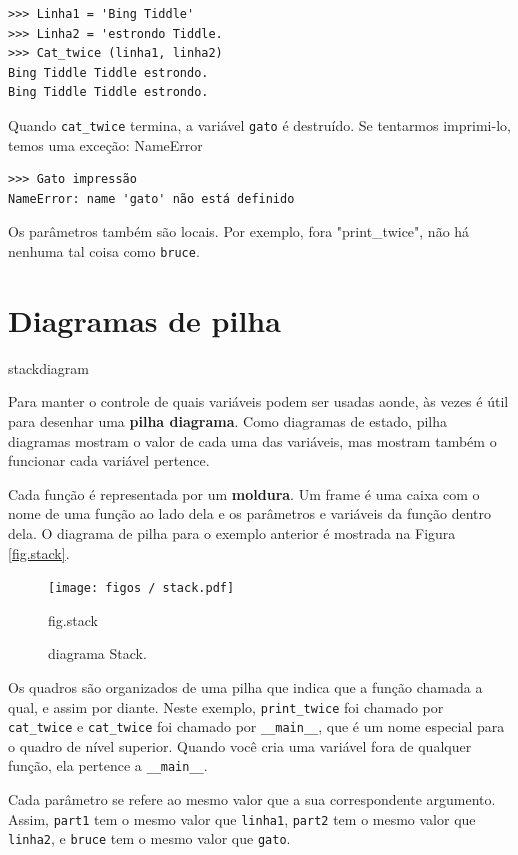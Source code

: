 \documentclass[10pt]{book}
\begin{document}
\begin{verbatim}
>>> Linha1 = 'Bing Tiddle'
>>> Linha2 = 'estrondo Tiddle.
>>> Cat_twice (linha1, linha2)
Bing Tiddle Tiddle estrondo.
Bing Tiddle Tiddle estrondo.
\end{verbatim}
%
Quando \verb "cat_twice" termina, a variável {\tt gato}
é destruído. Se tentarmos imprimi-lo, temos uma exceção:
\index{} NameError

\begin{verbatim}
>>> Gato impressão
NameError: name 'gato' não está definido
\end{verbatim}
%
Os parâmetros também são locais.
Por exemplo, fora \verbo "print_twice", não há nenhuma
tal coisa como {\tt bruce}.


\section{Diagramas de pilha}
\label{} stackdiagram

Para manter o controle de quais variáveis ​​podem ser usadas aonde, às vezes é
útil para desenhar uma {\bf pilha diagrama}. Como diagramas de estado, pilha
diagramas mostram o valor de cada uma das variáveis, mas mostram também o
funcionar cada variável pertence.

Cada função é representada por um {\bf moldura}. Um frame é uma caixa
com o nome de uma função
ao lado dela e os parâmetros e variáveis ​​da função dentro dela.
O diagrama de pilha para o
exemplo anterior é mostrada na Figura ~ \ref {fig.stack}.

\begin{figure}
\centerline
{\texttt{[image: figos / stack.pdf]}}
\caption{diagrama Stack.}
\label{} fig.stack
\end{figure}


Os quadros são organizados de uma pilha que indica que a função
chamada a qual, e assim por diante. Neste exemplo, \verb "print_twice"
foi chamado por \verb "cat_twice" e \verb "cat_twice" foi chamado por 
\Verb "__main__", que é um nome especial para o quadro de nível superior. Quando
você cria uma variável fora de qualquer função, ela pertence a 
\Verb "__main__".

Cada parâmetro se refere ao mesmo valor que a sua correspondente
argumento. Assim, {\tt part1} tem o mesmo valor que
{\tt linha1}, {\tt part2} tem o mesmo valor que {\tt linha2},
e {\tt bruce} tem o mesmo valor que {\tt gato}.
\end{document}
